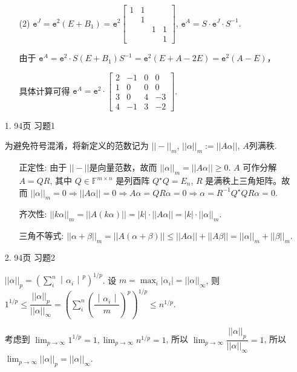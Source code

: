 \documentclass{article}
\begin{document}
\begin{spacing}{1.5}
\begin{enumerate}
\begin{itemize}
        
        \item [(2)] $\mathtt{e}^J = \mathtt{e}^{2}(E + B_1) = \mathtt{e}^{2} \left[\begin{array}{cccc}1&1&&\\&1&&\\&&1&1\\&&&1\end{array}\right]$, $\mathtt{e}^{A} = S\cdot \mathtt{e}^{J}\cdot S^{-1}$.

        由于 $\mathtt{e}^A = \mathtt{e}^2 \cdot S(E+B_1)S^{-1} = \mathtt{e}^2 (E + A - 2E) = \mathtt{e}^2 (A - E)$，

        具体计算可得 $\mathtt{e}^A = \mathtt{e}^2\cdot \left[\begin{array}{cccc}2&-1&0&0\\1&0&0&0\\3&0&4&-3\\4&-1&3&-2\end{array}\right]$.

    \end{itemize}

    \item [1.] 94页 习题1
    
    为避免符号混淆，将新定义的范数记为 $||-||_m$, $||\alpha||_m:=||A\alpha||$, $A$列满秩.
    \begin{itemize}
        \item [正定性:] 由于 $||-||$是向量范数，故而 $||\alpha||_m = ||A\alpha|| \geq 0$. $A$ 可作分解 $A = QR$, 其中 $Q\in\mathbb{F}^{m\times n}$ 是列酉阵 $Q^\star Q=E_n$, $R$ 是满秩上三角矩阵。故而 $||\alpha||_m=0\Rightarrow ||A\alpha||=0 \Rightarrow A\alpha=QR\alpha=0 \Rightarrow \alpha = R^{-1}Q^\star QR\alpha = 0$.
        \item [齐次性:] $||k\alpha||_m = ||A(k\alpha)|| = |k|\cdot||A\alpha|| = |k|\cdot||\alpha||_m$.
        \item [三角不等式:] $||\alpha+\beta||_m = ||A(\alpha+\beta)|| \leq ||A\alpha|| + ||A\beta|| = ||\alpha||_m + ||\beta||_m$.
    \end{itemize}

    \item [2.] 94页 习题2
    
    $||\alpha||_p =\left(\sum_{i}^{n} ｜\alpha_i｜^p\right)^{1/p}$. 设 $m = \max_{i} |\alpha_i| = ||\alpha||_\infty$, 则 $1^{1/p}\leq\dfrac{||\alpha||_p}{||\alpha||_\infty} = \left(\sum_{i}^{n} \left(\dfrac{｜\alpha_i｜}{m}\right)^p\right)^{1/p}\leq n^{1/p}$.

    考虑到 $\lim_{p\to\infty} 1^{1/p} = 1, \lim_{p\to\infty} n^{1/p} = 1$, 所以 $\lim_{p\to\infty} \dfrac{||\alpha||_p}{||\alpha||_\infty} = 1$, 所以 $\lim_{p\to\infty} ||\alpha||_p = ||\alpha||_{\infty}$.


\end{enumerate}
\end{spacing}
\end{document}
